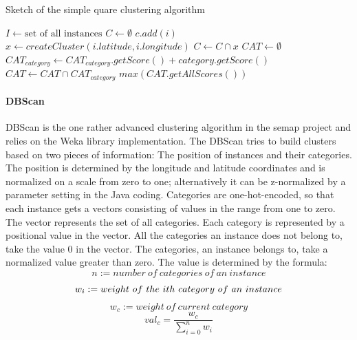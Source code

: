 \begin{algorithm}
\caption{Sketch of the simple quare clustering algorithm}\label{alg:ssca}
\begin{algorithmic} 
\STATE $I \gets \text{set~of~all~instances}$
\STATE $C \gets \emptyset$
  \STATE $c.add(i)$
  \ELSE 
  \STATE $x \gets createCluster(i.latitude, i.longitude)$
  \STATE $C \gets C \cap x$
\ENDIF
\ENDFOR
\ENDFOR
\STATE ${CAT} \gets \emptyset$
\STATE ${CAT}_{category} \gets {CAT}_{category}.getScore() + category.getScore()$
\STATE ${CAT} \gets {CAT} \cap {CAT}_{category}$
\ENDFOR
\ENDFOR
\RETURN $max({CAT}.getAllScores())$
\end{algorithmic}
\end{algorithm}

\paragraph{DBScan}
DBScan is the one rather advanced clustering algorithm in the semap project and relies on the Weka library implementation. The DBScan tries to build clusters based on two pieces of information: The position of instances and their categories. The position is determined by the longitude and latitude coordinates and is normalized on a scale from zero to one; alternatively it can be z-normalized by a parameter setting in the Java coding. Categories are one-hot-encoded, so that each instance gets a vectors consisting of values in the range from one to zero. The vector represents the set of all categories. Each category is represented by a positional value in the vector. All the categories an instance does not belong to, take the value 0 in the vector. The categories, an instance belongs to, take a normalized value greater than zero. The value is determined by the formula: 
\begin{equation}
n := number~of~categories~of~an~instance
\end{equation}
\begin{equation}
w_i := weight~of~the~i\-th~category~of~an~instance
\end{equation}
\begin{equation}
w_c := weight~of~current~category
\end{equation}
\begin{equation}\label{eq:normalization}
val_c = \frac{w_c}{\sum_{i=0}^{n}w_i}
\end{equation}

